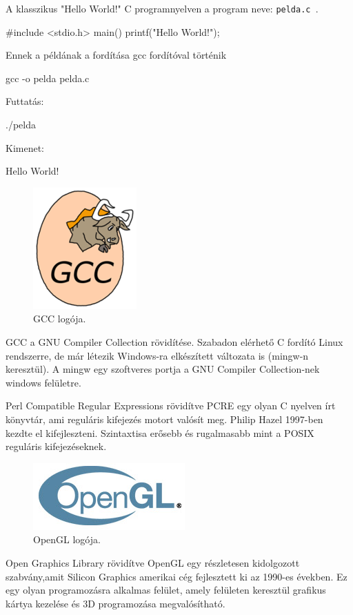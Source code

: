 A klasszikus "Hello World!" C programnyelven a program neve: \texttt{pelda.c }.
\bigskip
\begin{cpp}
#include <stdio.h>
 main()
 {
 printf("Hello World!\n");
 } 
\end{cpp}
\bigskip
Ennek a példának a fordítása gcc fordítóval történik
\begin{cpp}
gcc -o pelda pelda.c
\end{cpp}
\bigskip
Futtatás:
\begin{cpp}
./pelda
\end{cpp}
\bigskip
Kimenet:
\begin{cpp}
Hello World!
\end{cpp}
\bigskip
{}
\bigskip
\begin{figure}[h]
\centering
\includegraphics[scale=0.6]{images/gcc.png}
\caption{GCC logója.}
\end{figure}
\bigskip
GCC a GNU Compiler Collection rövidítése. Szabadon elérhető C fordító Linux rendszerre, de már létezik Windows-ra elkészített változata is (mingw-n keresztül). A mingw egy szoftveres portja a GNU Compiler Collection-nek windows felületre.\cite{gnu2003richard}


Perl Compatible Regular Expressions rövidítve PCRE egy olyan C nyelven írt könyvtár, ami reguláris kifejezés motort valósít meg. Philip Hazel 1997-ben kezdte el kifejleszteni. Szintaxtisa erősebb és rugalmasabb mint a POSIX reguláris kifejezéseknek.\cite{philip1997pcre}


\begin{figure}[h]
\centering
\includegraphics[scale=0.6]{images/opengl_logo.jpg}
\caption{OpenGL logója.}
\end{figure}
\bigskip
Open Graphics Library rövidítve OpenGL egy részletesen kidolgozott szabvány,amit  Silicon Graphics amerikai cég fejlesztett ki az 1990-es években. Ez egy olyan programozásra alkalmas felület, amely felületen keresztül grafikus kártya kezelése és 3D programozása megvalósítható.\cite{mason1999opengl}

